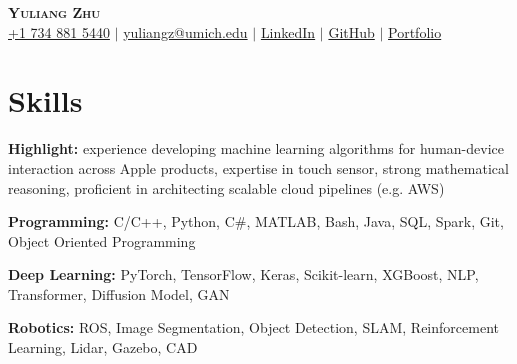 \documentclass[letterpaper,11pt]{article}
\newcommand{\resumeSubHeadingListStart}{\begin{itemize}[leftmargin=0.15in, label={}]}
\newcommand{\resumeSubHeadingListEnd}{\end{itemize}}
\begin{document}

\begin{center}
    \textbf{\Huge \scshape Yuliang Zhu} \\ \vspace{1pt}
    \small
    \faMobile \hspace{.5pt} \href{tel:1734885440}{+1 734 881 5440}
    $|$
    \faAt \hspace{.5pt} \href{mailto:yuliangz@umich.edu}{yuliangz@umich.edu}
    $|$
    \faLinkedinSquare \hspace{.5pt} \href{https://www.linkedin.com/in/yuliang-zhu-34005315b}{LinkedIn}
    $|$
    \faGithub \hspace{.5pt} \href{https://github.com/angrypiggy}{GitHub}
    $|$
    \faGlobe \hspace{.5pt} \href{https://angrypiggy.github.io/yuliangz/}{Portfolio}
\end{center}


\vspace*{-15pt}
\section{Skills}
  \vspace{1pt}
  \resumeSubHeadingListStart
    \small{\item{
        \textbf{Highlight:}{ experience developing machine learning algorithms for human-device interaction across Apple products, expertise in touch sensor, strong mathematical reasoning, proficient in architecting scalable cloud pipelines (e.g. AWS)} \\ \vspace{3pt}

        \textbf{Programming:}{ C/C++, Python, C\#, MATLAB, Bash, Java, SQL, Spark, Git, Object Oriented Programming} \\ \vspace{3pt}
        
        \textbf{Deep Learning:}{ PyTorch, TensorFlow, Keras, Scikit-learn, XGBoost, NLP, Transformer, Diffusion Model, GAN} \\ \vspace{3pt}
        
        \textbf{Robotics:}{ ROS, Image Segmentation, Object Detection, SLAM, Reinforcement Learning, Lidar, Gazebo, CAD} \\ \vspace{3pt}

        
        
    }}
  \resumeSubHeadingListEnd
\end{document}
